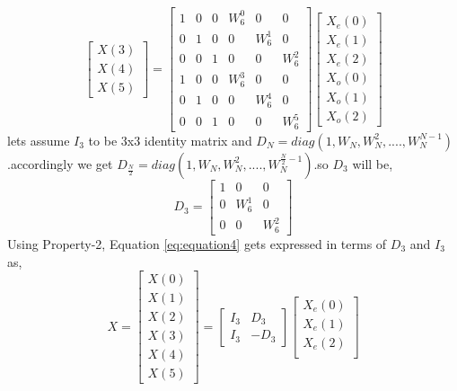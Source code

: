 \documentclass[journal,12pt,twocolumn]{IEEEtran}
\renewcommand\thesection{\arabic{section}}
\begin{document}
\begin{enumerate}[label=\thesection.\arabic*.,ref=\thesection.\theenumi]
\begin{equation}
\begin{bmatrix}
X(3) \\ 
X(4) \\ 
X(5) 
\end{bmatrix}
=
\begin{bmatrix}
1 & 0 & 0 & W^{0}_{6} & 0 & 0\\
0 & 1 & 0 &  0 & W^{1}_{6} & 0\\
0 & 0 & 1 & 0 & 0 & W^{2}_{6}\\
1 & 0 & 0 & W^{3}_{6} & 0 & 0\\
0 & 1 & 0 & 0 & W^{4}_{6} & 0\\
0 & 0 & 1 & 0 & 0 & W^{5}_{6}
\end{bmatrix}
\begin{bmatrix}
X_{e}(0) \\ 
X_{e}(1) \\ 
X_{e}(2) \\ 
X_{o}(0) \\ 
X_{o}(1) \\ 
X_{o}(2)
\end{bmatrix}
\label{eq:equation4}
\end{equation}
lets assume  $I_{3}$ to be 3x3 identity matrix and $D_{N} = diag(1,W_{N},W_{N}^{2},....,W_{N}^{N-1})$ .accordingly we get  $D_{\frac{N}{2}} = diag(1,W_{N},W_{N}^{2},....,W_{N}^{\frac{N}{2} -1})$.so  $D_{3}$ will be,
\begin{equation}
D_{3}=
\begin{bmatrix}
1 & 0 & 0 \\
0 & W^{1}_{6} & 0 \\
0 & 0 & W^{2}_{6}
\end{bmatrix}
\end{equation}
Using Property-2, Equation \eqref{eq:equation4} gets expressed  in terms of   $D_{3}$ and $I_{3}$ as,
\begin{equation}
X
=
\begin{bmatrix}
X(0) \\ 
X(1) \\ 
X(2) \\ 
X(3) \\ 
X(4) \\ 
X(5) 
\end{bmatrix}
=
\begin{bmatrix}
I_{3} & D_{3} \\
I_{3} & -D_{3}
\end{bmatrix}
\begin{bmatrix}
X_{e}(0) \\ 
X_{e}(1) \\ 
X_{e}(2) \\ 

\end{bmatrix}
\end{equation}
\end{enumerate}
\end{document}
